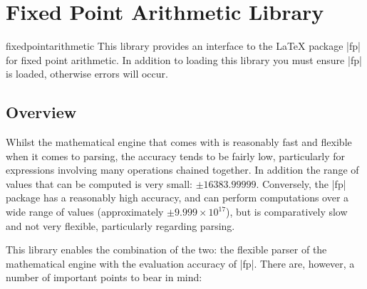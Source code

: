 %
%
%


\section{Fixed Point Arithmetic Library}

\begin{pgflibrary}{fixedpointarithmetic}
  This library provides an interface to the \LaTeX{} package
  |fp| for fixed point arithmetic. 	In addition to loading this
  library you must ensure |fp| is loaded, otherwise errors
  will occur.
\end{pgflibrary}

\subsection{Overview}

  Whilst the mathematical engine that comes with \pgfname{} is
  reasonably fast and flexible when it comes to parsing, the accuracy
  tends to be fairly low, particularly for expressions involving many
  operations chained together. In addition the range of values that
  can be computed is very small: $\pm16383.99999$.
	Conversely, the |fp| package has a reasonably high accuracy, and
	can	perform computations over a wide range of
	values (approximately $\pm9.999\times10^{17}$), but is comparatively
	slow and not very
	flexible, particularly regarding parsing.

  This library enables the combination of the two: the flexible parser
  of the \pgfname{} mathematical engine with the evaluation accuracy
  of |fp|. There are, however, a number of important points to
  bear in mind:


